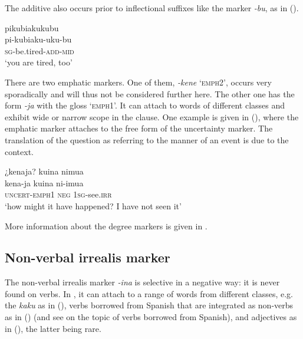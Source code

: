 The additive also occurs prior to inflectional suffixes like the  marker \textit{-bu}, as in ().

\ea\label{ex:FirstAdd-3}
\begingl
\glpreamble pikubiakukubu\\
\gla pi-kubiaku-uku-bu\\
\textsc{sg}-be.tired-\textsc{add}-\textsc{mid}\\
\glft ‘you are tired, too’
\endgl
\trailingcitation{[cux-c120414ls-2.329]}
\xe{} 

There are two emphatic markers. One of them, \textit{-kene} ‘\textsc{emph}2’, occurs very sporadically and will thus not be considered further here. The other one has the form \textit{-ja} with the gloss ‘\textsc{emph}1’. It can attach to words of different classes and exhibit wide or narrow scope in the clause. One example is given in (), where the emphatic marker attaches to the free form of the uncertainty marker. The translation of the question as referring to the manner of an event is due to the context.


\ea\label{ex:FirstEmph-1}
\begingl
\glpreamble ¿kenaja? kuina nimua\\
\gla kena-ja kuina ni-imua\\
\glb \textsc{uncert}-\textsc{emph}1 \textsc{neg} 1\textsc{sg}-see.\textsc{irr}\\
\glft ‘how might it have happened? I have not seen it’
\endgl
{}
\xe


More information about the degree markers is given in .


\subsection{Non-verbal irrealis marker}\label{sec:AffCl_nvirr}

The non-verbal irrealis marker \textit{-ina} is selective in a negative way: it is never found on verbs. In , it can attach to a range of words from different classes, e.g. the  \textit{kaku} as in (), verbs borrowed from Spanish that are integrated as non-verbs as in () (and see  on the topic of verbs borrowed from Spanish), and adjectives as in (), the latter being rare.

